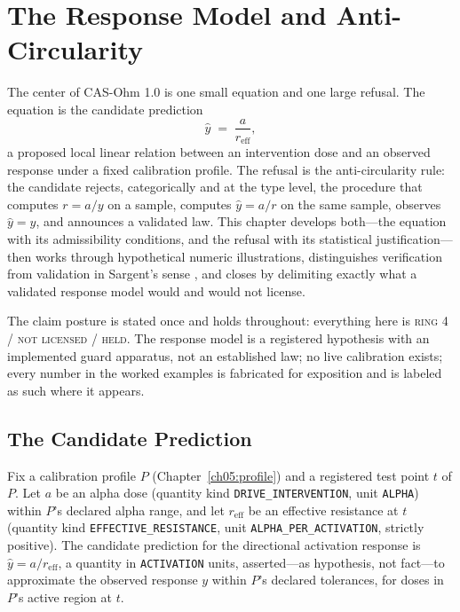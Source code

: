 \chapter{The Response Model and Anti-Circularity}\label{ch06:response}

The center of CAS-Ohm 1.0 is one small equation and one large refusal. The
equation is the candidate prediction
\[
\hat y \;=\; \frac{a}{r_{\mathrm{eff}}},
\]
a proposed local linear relation between an intervention dose and an
observed response under a fixed calibration profile. The refusal is the
anti-circularity rule: the candidate rejects, categorically and at the type
level, the procedure that computes $r = a/y$ on a sample, computes
$\hat y = a/r$ on the same sample, observes $\hat y = y$, and announces a
validated law. This chapter develops both---the equation with its
admissibility conditions, and the refusal with its statistical
justification---then works through hypothetical numeric illustrations,
distinguishes verification from validation in Sargent's sense
\cite{sargent}, and closes by delimiting exactly what a validated response
model would and would not license.

The claim posture is stated once and holds throughout: everything here is
\textsc{ring 4 / not licensed / held}. The response model is a registered
hypothesis with an implemented guard apparatus, not an established law; no
live calibration exists; every number in the worked examples is fabricated
for exposition and is labeled as such where it appears.

\section{The Candidate Prediction}\label{ch06:prediction}

\begin{definition}\label{ch06:def:prediction}
Fix a calibration profile $P$ (Chapter~\ref{ch05:profile}) and a registered
test point $t$ of $P$. Let $a$ be an alpha dose (quantity kind
\texttt{DRIVE\_INTERVENTION}, unit \texttt{ALPHA}) within $P$'s declared
alpha range, and let $r_{\mathrm{eff}}$ be an effective resistance at $t$
(quantity kind \texttt{EFFECTIVE\_RESISTANCE}, unit
\texttt{ALPHA\_PER\_ACTIVATION}, strictly positive). The candidate
prediction for the directional activation response is
$\hat y = a / r_{\mathrm{eff}}$, a quantity in \texttt{ACTIVATION} units,
asserted---as hypothesis, not fact---to approximate the observed response
$y$ within $P$'s declared tolerances, for doses in $P$'s active region at
$t$.
\end{definition}

